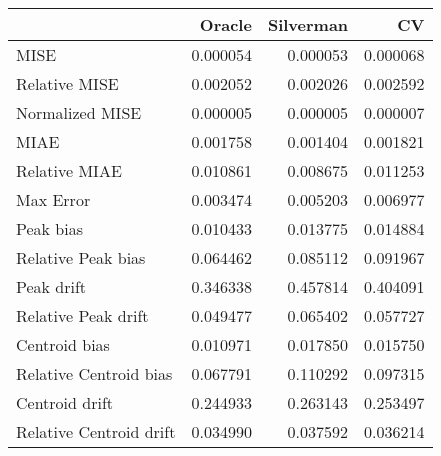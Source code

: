 \begin{tabular}{lrrr}
  \hline
 & Oracle & Silverman & CV \\ 
  \hline
MISE & 0.000054 & 0.000053 & 0.000068 \\ 
  Relative MISE & 0.002052 & 0.002026 & 0.002592 \\ 
  Normalized MISE & 0.000005 & 0.000005 & 0.000007 \\ 
  MIAE & 0.001758 & 0.001404 & 0.001821 \\ 
  Relative MIAE & 0.010861 & 0.008675 & 0.011253 \\ 
  Max Error & 0.003474 & 0.005203 & 0.006977 \\ 
  Peak bias & 0.010433 & 0.013775 & 0.014884 \\ 
  Relative Peak bias & 0.064462 & 0.085112 & 0.091967 \\ 
  Peak drift & 0.346338 & 0.457814 & 0.404091 \\ 
  Relative Peak drift & 0.049477 & 0.065402 & 0.057727 \\ 
  Centroid bias & 0.010971 & 0.017850 & 0.015750 \\ 
  Relative Centroid bias & 0.067791 & 0.110292 & 0.097315 \\ 
  Centroid drift & 0.244933 & 0.263143 & 0.253497 \\ 
  Relative Centroid drift & 0.034990 & 0.037592 & 0.036214 \\ 
   \hline
\end{tabular}
